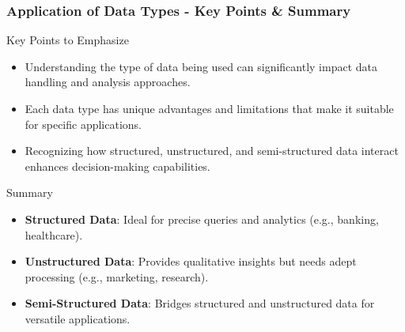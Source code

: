 \documentclass{beamer}
\begin{document}
\begin{frame}[fragile]
    \frametitle{Application of Data Types - Key Points & Summary}
    \begin{block}{Key Points to Emphasize}
        \begin{itemize}
            \item Understanding the type of data being used can significantly impact data handling and analysis approaches.
            \item Each data type has unique advantages and limitations that make it suitable for specific applications.
            \item Recognizing how structured, unstructured, and semi-structured data interact enhances decision-making capabilities.
        \end{itemize}
    \end{block}

    \begin{block}{Summary}
        \begin{itemize}
            \item \textbf{Structured Data}: Ideal for precise queries and analytics (e.g., banking, healthcare).
            \item \textbf{Unstructured Data}: Provides qualitative insights but needs adept processing (e.g., marketing, research).
            \item \textbf{Semi-Structured Data}: Bridges structured and unstructured data for versatile applications.
        \end{itemize}
    \end{block}
\end{frame}
\end{document}
